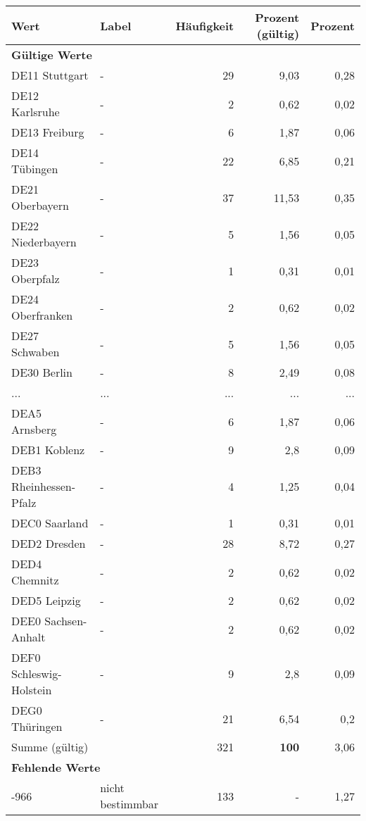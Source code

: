      \begin{longtable}{Xlrrr}
     \toprule
     \textbf{Wert} & \textbf{Label} & \textbf{Häufigkeit} & \textbf{Prozent (gültig)} & \textbf{Prozent} \\
     \endhead
     \midrule
     \multicolumn{5}{l}{\textbf{Gültige Werte}}\\
        \multicolumn{1}{X}{DE11 Stuttgart} & - & 29 & 9,03 & 0,28 \\
        \multicolumn{1}{X}{DE12 Karlsruhe} & - & 2 & 0,62 & 0,02 \\
        \multicolumn{1}{X}{DE13 Freiburg} & - & 6 & 1,87 & 0,06 \\
        \multicolumn{1}{X}{DE14 Tübingen} & - & 22 & 6,85 & 0,21 \\
        \multicolumn{1}{X}{DE21 Oberbayern} & - & 37 & 11,53 & 0,35 \\
        \multicolumn{1}{X}{DE22 Niederbayern} & - & 5 & 1,56 & 0,05 \\
        \multicolumn{1}{X}{DE23 Oberpfalz} & - & 1 & 0,31 & 0,01 \\
        \multicolumn{1}{X}{DE24 Oberfranken} & - & 2 & 0,62 & 0,02 \\
        \multicolumn{1}{X}{DE27 Schwaben} & - & 5 & 1,56 & 0,05 \\
        \multicolumn{1}{X}{DE30 Berlin} & - & 8 & 2,49 & 0,08 \\
       ... & ... & ... & ... & ... \\
        \multicolumn{1}{X}{DEA5 Arnsberg} & - & 6 & 1,87 & 0,06 \\
        \multicolumn{1}{X}{DEB1 Koblenz} & - & 9 & 2,8 & 0,09 \\
        \multicolumn{1}{X}{DEB3 Rheinhessen-Pfalz} & - & 4 & 1,25 & 0,04 \\
        \multicolumn{1}{X}{DEC0 Saarland} & - & 1 & 0,31 & 0,01 \\
        \multicolumn{1}{X}{DED2 Dresden} & - & 28 & 8,72 & 0,27 \\
        \multicolumn{1}{X}{DED4 Chemnitz} & - & 2 & 0,62 & 0,02 \\
        \multicolumn{1}{X}{DED5 Leipzig} & - & 2 & 0,62 & 0,02 \\
        \multicolumn{1}{X}{DEE0 Sachsen-Anhalt} & - & 2 & 0,62 & 0,02 \\
        \multicolumn{1}{X}{DEF0 Schleswig-Holstein} & - & 9 & 2,8 & 0,09 \\
        \multicolumn{1}{X}{DEG0 Thüringen} & - & 21 & 6,54 & 0,2 \\
     \midrule
      \multicolumn{2}{l}{Summe (gültig)} & 321 &
      \textbf{100} &
         3,06 \\
     \multicolumn{5}{l}{\textbf{Fehlende Werte}}\\
       -966 & nicht bestimmbar & 133 & - & 1,27 \\


\end{longtable}
